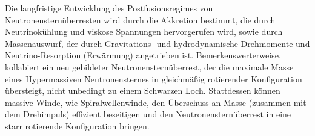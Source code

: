 
Die langfristige Entwicklung des Postfusionsregimes von Neutronensternüberresten wird durch die Akkretion bestimmt, 
die durch Neutrinokühlung und viskose Spannungen hervorgerufen wird, sowie durch Massenauswurf, der 
durch Gravitations- und hydrodynamische Drehmomente und Neutrino-Resorption (Erwärmung) angetrieben ist. 
Bemerkenswerterweise, kollabiert ein neu gebildeter Neutronensternüberrest, der die maximale Masse eines Hypermassiven Neutronensternes in gleichmäßig rotierender Konfiguration übersteigt, nicht unbedingt 
zu einem Schwarzen Loch. Stattdessen können massive Winde, wie Spiralwellenwinde, den 
Überschuss an Masse (zusammen mit dem Drehimpuls) effizient beseitigen und den Neutronensternüberrest 
in eine starr rotierende Konfiguration bringen.


